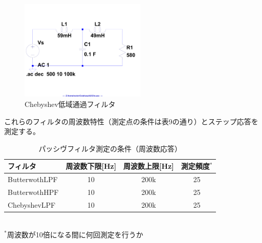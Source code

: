\documentclass[10pt,a4j,dvipdfmx]{jsarticle}
\begin{document}
  \begin{figure}[H]
    \centering
    \includegraphics[width=6cm, angle=270]{Che.pdf}
    \caption{Chebyshev低域通過フィルタ}
  \end{figure}
これらのフィルタの周波数特性（測定点の条件は表9の通り）とステップ応答を測定する。
\begin{table}[H]
  \begin{center}
    \caption{パッシヴフィルタ測定の条件（周波数応答）}
    \begin{tabular}{|l||c|c|c|} \hline
      フィルタ & 周波数下限[\si{\hertz}] & 周波数上限[\si{\hertz}] & 測定頻度$^*$\\ \hline \hline
      ButterwothLPF & 10 & 200k & 25\\
      ButterwothHPF & 10 & 200k & 25 \\ 
      ChebyshevLPF & 10 & 200k & 25 \\ 
      \hline
    \end{tabular}
    \\ $^*$周波数が10倍になる間に何回測定を行うか
  \end{center}
\end{table}
\end{document}
